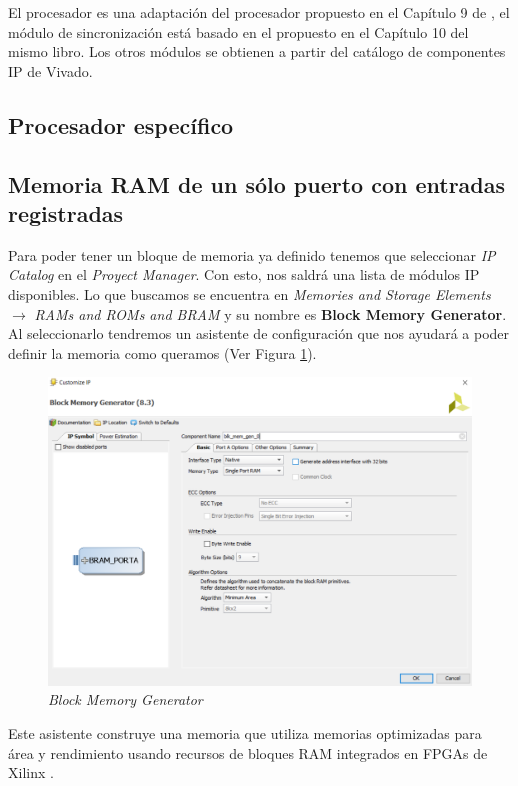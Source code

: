 El procesador es una adaptación del procesador propuesto en el Capítulo 9 de \cite{hamblen2007rapid}, el 
módulo de sincronización está basado en el propuesto en el Capítulo 10 del mismo libro. Los otros módulos 
se obtienen a partir del catálogo de componentes IP de Vivado.

\subsection{Procesador específico}

\subsection{Memoria RAM de un sólo puerto con entradas registradas}

Para poder tener un bloque de memoria ya definido tenemos que seleccionar \textit{IP Catalog} en el \textit{Proyect 
Manager}. Con esto, nos saldrá una lista de módulos IP disponibles. Lo que buscamos se encuentra en 
\textit{Memories and Storage Elements} $\rightarrow$ \textit{RAMs and ROMs and BRAM} y su nombre es 
\textbf{Block Memory Generator}. Al seleccionarlo tendremos un asistente de configuración que nos ayudará 
a poder definir la memoria como queramos (Ver Figura \ref{memoria}).

\begin{figure}[H]
    \centering
    \includegraphics[width = 1\textwidth]{imagenes/blockmemory.PNG}
    \caption{\textit{Block Memory Generator}}\label{memoria}
\end{figure}

Este asistente construye una memoria que utiliza memorias optimizadas para área y rendimiento usando recursos 
de bloques RAM integrados en FPGAs de Xilinx \cite{memoria}.

